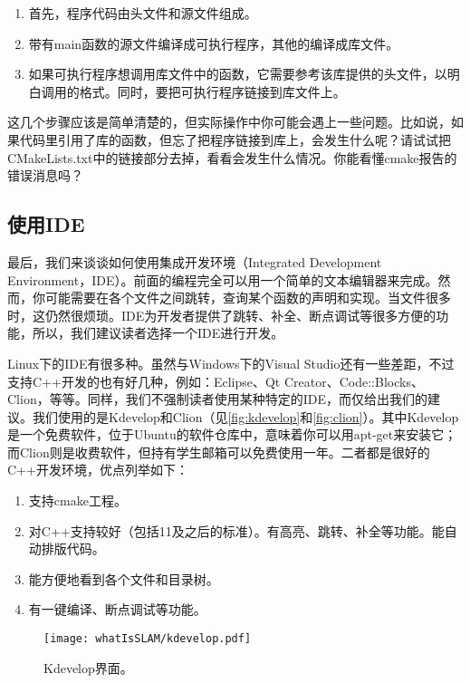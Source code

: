 \begin{enumerate}
	\item 首先，程序代码由头文件和源文件组成。
	\item 带有main函数的源文件编译成可执行程序，其他的编译成库文件。
	\item 如果可执行程序想调用库文件中的函数，它需要参考该库提供的头文件，以明白调用的格式。同时，要把可执行程序链接到库文件上。
\end{enumerate}

这几个步骤应该是简单清楚的，但实际操作中你可能会遇上一些问题。比如说，如果代码里引用了库的函数，但忘了把程序链接到库上，会发生什么呢？请试试把CMakeLists.txt中的链接部分去掉，看看会发生什么情况。你能看懂cmake报告的错误消息吗？

\subsection{使用IDE}
最后，我们来谈谈如何使用集成开发环境（Integrated Development Environment，IDE）。前面的编程完全可以用一个简单的文本编辑器来完成。然而，你可能需要在各个文件之间跳转，查询某个函数的声明和实现。当文件很多时，这仍然很烦琐。IDE为开发者提供了跳转、补全、断点调试等很多方便的功能，所以，我们建议读者选择一个IDE进行开发。

Linux下的IDE有很多种。虽然与Windows下的Visual Studio还有一些差距，不过支持C++开发的也有好几种，例如：Eclipse、Qt Creator、Code::Blocks、Clion，等等。同样，我们不强制读者使用某种特定的IDE，而仅给出我们的建议。我们使用的是Kdevelop和Clion（见\autoref{fig:kdevelop}和\autoref{fig:clion}）。其中Kdevelop是一个免费软件，位于Ubuntu的软件仓库中，意味着你可以用apt-get来安装它；而Clion则是收费软件，但持有学生邮箱可以免费使用一年。二者都是很好的C++开发环境，优点列举如下：

\begin{enumerate}
	\item 支持cmake工程。
	\item 对C++支持较好（包括11及之后的标准）。有高亮、跳转、补全等功能。能自动排版\mbox{代码。}
	\item 能方便地看到各个文件和目录树。
	\item 有一键编译、断点调试等功能。
\end{enumerate}

\begin{figure}[!ht]
	\centering
	\texttt{[image: whatIsSLAM/kdevelop.pdf]}
	\caption{Kdevelop界面。}
	\label{fig:kdevelop}
\end{figure}

